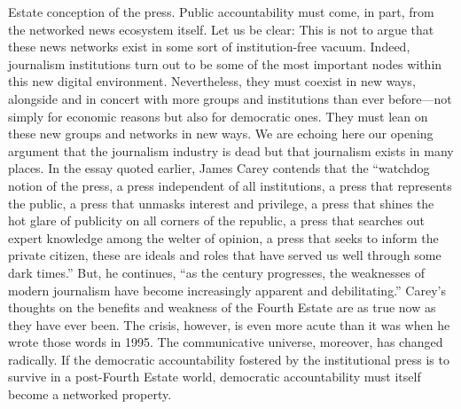 Estate conception of the press. Public accountability must come, in part, from the
networked news ecosystem itself. Let us be clear: This is not to argue that these
news networks exist in some sort of institution-free vacuum. Indeed, journalism
institutions turn out to be some of the most important nodes within this new
digital environment. Nevertheless, they must coexist in new ways, alongside and
in concert with more groups and institutions than ever before—not simply for
economic reasons but also for democratic ones. They must lean on these new
groups and networks in new ways. We are echoing here our opening argument
that the journalism industry is dead but that journalism exists in many places.
In the essay quoted earlier, James Carey contends that the ``watchdog notion of
the press, a press independent of all institutions, a press that represents the public,
a press that unmasks interest and privilege, a press that shines the hot glare of
publicity on all corners of the republic, a press that searches out expert knowledge
among the welter of opinion, a press that seeks to inform the private citizen,
these are ideals and roles that have served us well through some dark times.'' But,
he continues, ``as the century progresses, the weaknesses of modern journalism
have become increasingly apparent and debilitating.''
Carey’s thoughts on the benefits and weakness of the Fourth Estate are as true
now as they have ever been. The crisis, however, is even more acute than it was
when he wrote those words in 1995. The communicative universe, moreover, has
changed radically. If the democratic accountability fostered by the institutional
press is to survive in a post-Fourth Estate world, democratic accountability must
itself become a networked property.

